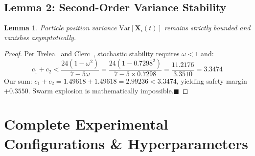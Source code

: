 \documentclass[journal]{IEEEtran}
\newtheorem{lemma}{Lemma}
\begin{document}
\subsection{Lemma 2: Second-Order Variance Stability}
\begin{lemma}
Particle position variance $\mathrm{Var}[\mathbf{X}_i(t)]$ remains strictly
bounded and vanishes asymptotically.
\end{lemma}
\begin{proof}
Per Trelea~\cite{trelea2003} and Clerc~\cite{clerc2002}, stochastic stability
requires $\omega<1$ and:
\begin{equation}
  c_1 + c_2 < \frac{24(1-\omega^2)}{7-5\omega}
  = \frac{24(1-0.7298^2)}{7-5\times0.7298}
  = \frac{11.2176}{3.3510} = \mathbf{3.3474}
\end{equation}
Our sum: $c_1+c_2=1.49618+1.49618=\mathbf{2.99236}<3.3474$, yielding safety
margin $\mathbf{+0.3550}$. Swarm explosion is mathematically
impossible.\hfill$\blacksquare$
\end{proof}

\appendix
\section{Complete Experimental Configurations \& Hyperparameters}
\label{app:hyperparams}
\end{document}
